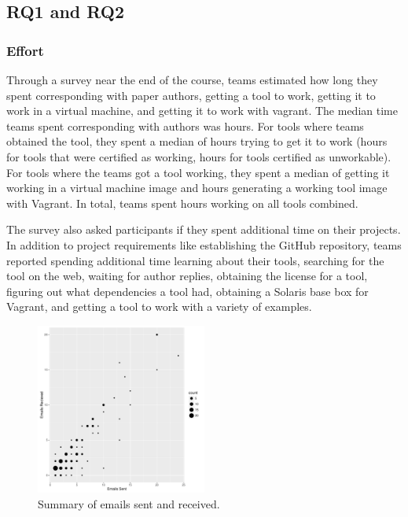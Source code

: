 \documentclass{sig-alternate-05-2015}
\begin{document}
\subsection{RQ1 and RQ2}

\subsubsection{Effort}

Through a survey near the end of the course, 
teams estimated how long they spent
corresponding with paper authors,
getting a tool to work,
getting it to work in a virtual machine,
and getting it to work with vagrant.
The median time teams spent corresponding with
authors was \durationCorresponding hours.
For tools where teams obtained the tool,
they spent a median of \durationWorking hours
trying to get it to work
(\durationWorkingOnWorkable hours for tools that were certified as working,
\durationWorkingOnUnWorkable hours for tools certified as unworkable).
For tools where the teams got a tool working,
they spent a median of \durationVM getting it working 
in a virtual machine image and
\durationVagrant hours generating a working tool
image with Vagrant.
In total, teams spent \durationTotal hours working
on all tools combined.


The survey also asked participants if they spent
additional time on their projects.
In addition to project requirements like establishing
the GitHub repository, teams 
reported spending additional time 
learning about their tools,
searching for the tool on the web,
waiting for author replies,
obtaining the license for a tool,
figuring out what dependencies a tool had,
obtaining a Solaris base box for Vagrant,
and
getting a tool to work with a variety of examples.

\begin{figure}[!ht]
  \centering
    \includegraphics[width=0.5\textwidth]{emailPlot.pdf}
  \caption{Summary of emails sent and received.}\label{fig:emailSnR}
\end{figure}
\end{document}
